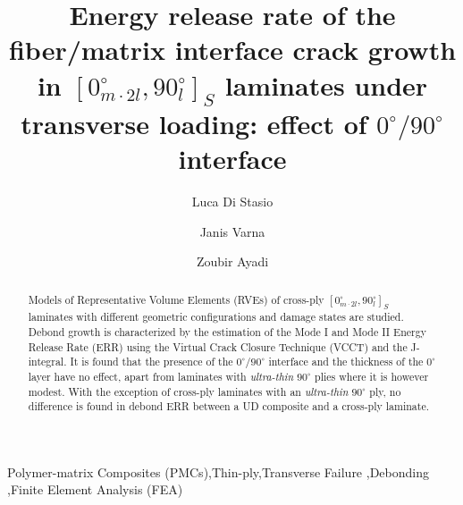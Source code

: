 \documentclass[review]{elsarticle}
\begin{document}
\begin{frontmatter}

\title{Energy release rate of the fiber/matrix interface crack growth in $\left[0_{m\cdot2l}^{\circ},90_{l}^{\circ}\right]_{S}$ laminates under transverse loading: effect of $0^{\circ}/90^{\circ}$ interface}


\author[lulea,nancy]{Luca Di Stasio}
\author[lulea]{Janis Varna}
\author[nancy]{Zoubir Ayadi}


\address[lulea]{Lule\aa\ University of Technology, University Campus, SE-97187 Lule\aa, Sweden}
\address[nancy]{Universit\'e de Lorraine, EEIGM, IJL, 6 Rue Bastien Lepage, F-54010 Nancy, France}

\begin{abstract}
\noindent
Models of Representative Volume Elements (RVEs) of cross-ply $\left[0_{m\cdot2l}^{\circ},90_{l}^{\circ}\right]_{S}$ laminates with different geometric configurations and damage states are studied. Debond growth is characterized by the estimation of the Mode I and Mode II Energy Release Rate (ERR) using the Virtual Crack Closure Technique (VCCT) and the J-integral. It is found that the presence of the $0^{\circ}/90^{\circ}$ interface and the thickness of the $0^{\circ}$ layer have no effect, apart from laminates with \emph{ultra-thin} $90^{\circ}$ plies where it is however modest. With the exception of cross-ply laminates with an \emph{ultra-thin} $90^{\circ}$ ply, no difference is found in debond ERR between a UD composite and a cross-ply laminate.
\end{abstract}

\begin{keyword}
Polymer-matrix Composites (PMCs)\sep Thin-ply\sep Transverse Failure \sep Debonding \sep Finite Element Analysis (FEA)
\end{keyword}


\end{frontmatter}
\end{document}

